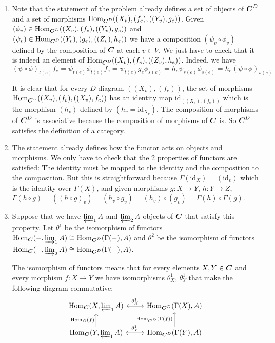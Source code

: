 \begin{sol}
	\begin{enumerate}[label=\alph*)]
		\item Note that the statement of the problem already defines a set of objects of $\boldsymbol{C}^D$ and a set of morphisms $\mathrm{Hom}_{\boldsymbol{C}^D}((X_v), (f_e), ((Y_v), g_e))$. Given $(\phi_v) \in \mathrm{Hom}_{\boldsymbol{C}^D}((X_v), (f_e), ((Y_v), g_e))$ and $(\psi_v) \in \mathrm{Hom}_{\boldsymbol{C}^D}((Y_v), (g_e), ((Z_v), h_e))$ we have a composition $(\psi_v \circ \phi_v)$ defined by the composition of $\boldsymbol{C}$ at each $v \in V$. We just have to check that it is indeed an element of $\mathrm{Hom}_{\boldsymbol{C}^D}((X_v), (f_e), ((Z_v), h_e))$. Indeed, we have 
		\[
			(\psi \circ \phi)_{t(e)} f_e = \psi_{t(e)} \phi_{t(e)} f_e = \psi_{t(e)} g_e \phi_{s(e)} = h_e \psi_{s(e)} \phi_{s(e)} = h_e (\psi \circ \phi)_{s(e)}
		\]

		It is clear that for every $D$-diagram $((X_v), (f_e))$, the set of morphisms $\mathrm{Hom}_{\boldsymbol{C}^D}((X_v), (f_e), ((X_v), f_e))$ has an identity map $\text{id}_{((X_v), (f_e))}$ which is the morphism $(h_v)$ defined by $(h_v = \text{id}_{X_v})$. The composition of morphisms of $\boldsymbol{C}^D$ is associative because the composition of morphisms of $\boldsymbol{C}$ is. So $\boldsymbol{C}^D$ satisfies the definition of a category.

		\item The statement already defines how the functor acts on objects and morphisms. We only have to check that the 2 properties of functors are satisfied: The identity must be mapped to the identity and the composition to the composition. But this is straightforward because $\Gamma(\text{id}_{X}) = (\text{id}_{v})$ which is the identity over $\Gamma(X)$, and given morphisms $g: X \to Y$, $h: Y \to Z$, $\Gamma(h \circ g) = ((h \circ g)_v) = (h_v \circ g_v) = (h_v) \circ (g_v) = \Gamma(h) \circ \Gamma(g)$.

		\item Suppose that we have $\varprojlim_1 A$ and $\varprojlim_2 A$ objects of $\boldsymbol{C}$ that satisfy this property. Let $\theta^1$ be the isomorphism of functors $\mathrm{Hom}_{\boldsymbol{C}}(-, \varinjlim_1 A) \cong \mathrm{Hom}_{\boldsymbol{C}^D}(\Gamma(-), A)$ and $\theta^2$ be the isomorphism of functors $\mathrm{Hom}_{\boldsymbol{C}}(-, \varinjlim_2 A) \cong \mathrm{Hom}_{\boldsymbol{C}^D}(\Gamma(-), A)$.

		The isomorphism of functors means that for every elements $X, Y \in \boldsymbol{C}$ and every morphism $f: X \to Y$ we have isomorphisms $\theta^1_X$, $\theta^1_Y$ that make the following diagram commutative:
		\[
			\begin{tikzcd}
				\Hom_{\Cat}(X, \varprojlim_1 A) \arrow[r, "\theta^1_{X}", leftrightarrow] 
				  & \Hom_{\Cat^D} (\Gamma(X), A) \\
				\Hom_{\Cat}(Y, \varprojlim_1 A) \arrow[r, "\theta^1_{Y}", leftrightarrow] \arrow[u, "\Hom_{\Cat} \left ( f \right )"]
				  & \Hom_{\Cat^D} (\Gamma(Y), A) \arrow[u, "\Hom_{\Cat^D} \left ( \Gamma \left (f \right ) \right )"]
			\end{tikzcd}
		\]


\end{enumerate}
\end{sol}
